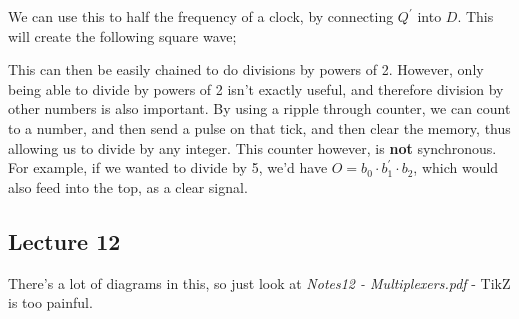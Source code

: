 \documentclass[a4paper, 12pt]{article}
\begin{document}
            We can use this to half the frequency of a clock, by connecting $Q^\prime$ into $D$. This will create the following square wave;
            \begin{center}
            \end{center}
            This can then be easily chained to do divisions by powers of 2. However, only being able to divide by powers of 2 isn't exactly useful, and therefore division by other numbers is also important. By using a ripple through counter, we can count to a number, and then send a pulse on that tick, and then clear the memory, thus allowing us to divide by any integer. This counter however, is \textbf{not} synchronous. For example, if we wanted to divide by 5, we'd have $O = b_0 \cdot b_1^\prime \cdot b_2$, which would also feed into the top, as a clear signal.
            \begin{center}
            \end{center}
        \subsection*{Lecture 12}
            There's a lot of diagrams in this, so just look at \textit{Notes12 - Multiplexers.pdf} - TikZ is too painful.
            \medskip
\end{document}
